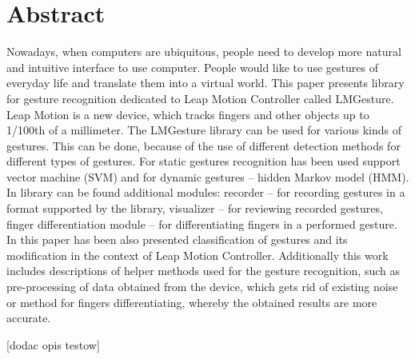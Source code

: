 
\chapter{Abstract}
Nowadays, when computers are ubiquitous, people need to develop more natural and intuitive interface to use computer. People would like to use gestures of everyday life and translate them into a virtual world. This paper presents library for gesture recognition dedicated to Leap Motion Controller called LMGesture.  Leap Motion is a new device, which tracks fingers and other objects up to 1/100th of a millimeter. The LMGesture library can be used for various kinds of gestures. This can be done, because of the use of different detection methods for different types of gestures. For static gestures recognition has been used support vector machine (SVM) and for dynamic gestures -- hidden Markov model (HMM). In library can be found additional modules: recorder -- for recording gestures in a format supported by the library, visualizer -- for reviewing recorded gestures, finger differentiation module -- for differentiating fingers in a performed gesture.  In this paper has been also presented classification of gestures and its modification in the context of Leap Motion Controller. Additionally this work includes descriptions of helper methods used for the gesture recognition, such as pre-processing of data obtained from the device, which gets rid of existing noise or method for fingers differentiating, whereby the obtained results are more accurate.

{\color{red} [dodac opis testow]}